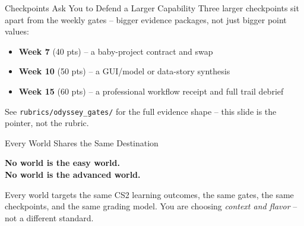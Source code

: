 \documentclass[aspectratio=169]{beamer}
\begin{document}
\begin{odysseygateframe}{Checkpoints Ask You to Defend a Larger Capability}
  Three larger checkpoints sit apart from the weekly gates -- bigger
  evidence packages, not just bigger point values:
  \begin{itemize}
    \item \textbf{Week 7} (40 pts) -- a baby-project contract and swap
    \item \textbf{Week 10} (50 pts) -- a GUI/model or data-story synthesis
    \item \textbf{Week 15} (60 pts) -- a professional workflow receipt and full trail debrief
  \end{itemize}
  \vspace{2mm}
  \small See \texttt{rubrics/odyssey\_gates/} for the full evidence shape --
  this slide is the pointer, not the rubric.
\end{odysseygateframe}

\begin{conceptframe}{Every World Shares the Same Destination}
  \begin{center}
    \large\color{cs2primary}\textbf{No world is the easy world.}\\
    \large\color{cs2primary}\textbf{No world is the advanced world.}
  \end{center}
  \vspace{3mm}
  Every world targets the same CS2 learning outcomes, the same gates,
  the same checkpoints, and the same grading model. You are choosing
  \emph{context and flavor} -- not a different standard.
\end{conceptframe}
\end{document}

